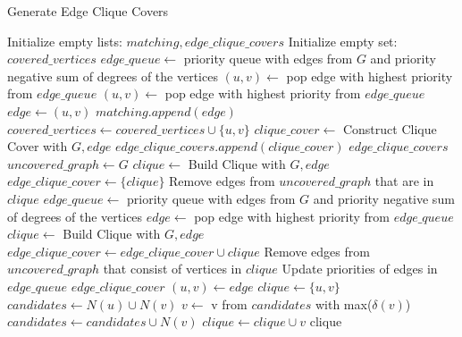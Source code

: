 \begin{algorithm}
\caption{Generate Edge Clique Covers}
\begin{algorithmic}[1]
\State Initialize empty lists: $matching, edge\_clique\_covers$
\State Initialize empty set: $covered\_vertices$
\State $edge\_queue\gets$ priority queue with edges from $G$ and priority negative sum of degrees of the vertices
    \State $(u, v)\gets$ pop edge with highest priority from $edge\_queue$
        \State $(u, v)\gets$ pop edge with highest priority from $edge\_queue$
    \EndWhile
    \State $edge\gets (u, v)$
    \State $matching.append(edge)$
    \State $covered\_vertices\gets covered\_vertices\cup \{u, v\}$
\EndFor
{}
    \State $clique\_cover\gets$ Construct Clique Cover with $G, edge$
    \State $edge\_clique\_covers.append(clique\_cover)$
\EndFor
\Return $edge\_clique\_covers$
\EndProcedure
{}
\State $uncovered\_graph\gets G$
\State $clique\gets$ Build Clique with $G, edge$
\State $edge\_clique\_cover\gets \{clique\}$
\State Remove edges from $uncovered\_graph$ that are in $clique$
\State $edge\_queue\gets$ priority queue with edges from $G$ and priority negative sum of degrees of the vertices
    \State $edge\gets$ pop edge with highest priority from $edge\_queue$
    \State $clique\gets$ Build Clique with $G, edge$
    \State $edge\_clique\_cover\gets edge\_clique\_cover\cup {clique}$
    \State Remove edges from $uncovered\_graph$ that consist of vertices in $clique$
    \State Update priorities of edges in $edge\_queue$
\EndWhile
\Return $edge\_clique\_cover$
\EndProcedure
{}
\State $(u, v)\gets edge$
\State $clique\gets \{u, v\}$
\State $candidates\gets N(u)\cup N(v)$
    \State $v\gets$ v from $candidates$ with max($\delta(v)$)
    \State $candidates\gets candidates\cup N(v)$
    \State $clique\gets clique\cup {v}$
\EndWhile
\Return clique
\EndProcedure
\end{algorithmic}
\end{algorithm}

